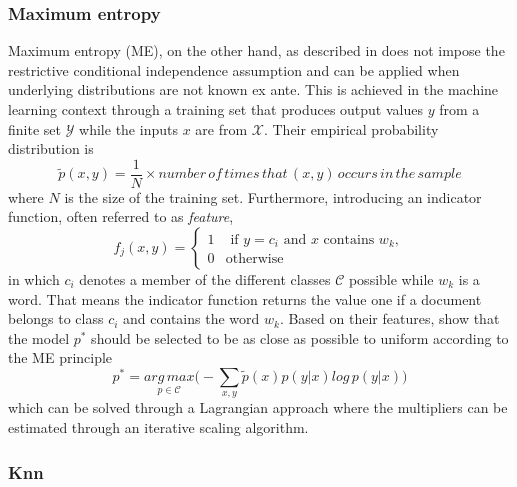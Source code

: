 \subsubsection{Maximum entropy} %
Maximum entropy (ME), on the other hand, as described in \textcite{Berger.1996} does not impose the restrictive conditional independence assumption and can be applied when underlying distributions are not known ex ante. 
This is achieved in the machine learning context through a training set that produces output values $y$ from a finite set $\mathcal{Y}$ while the inputs $x$ are from $\mathcal{X}$. Their empirical probability distribution is
%
\begin{equation*}
	\tilde{p}(x,y) = \frac{1}{N}\times number\, of\, times\, that\, (x,y)\, occurs\, in\, the\, sample
\end{equation*}
%
where $N$ is the size of the training set. Furthermore, introducing an indicator function, often referred to as \textit{feature},
%
\begin{equation*}
	f_j(x,y) = 
				\begin{cases}
					1 &\text{ if } y = c_i \text{ and $x$ contains $w_k$},\\
					0 & \text{otherwise }
				\end{cases}
\end{equation*}
%
in which $c_i$ denotes a member of the different classes $\mathcal{C}$ possible while $w_k$ is a word. That means the indicator function returns the value one if a document belongs to class $c_i$ and contains the word $w_k$. Based on their features, \textcite{Berger.1996} show that the model $p^*$ should be selected to be as close as possible to uniform according to the ME principle
%
\begin{equation}
	p^* = \underset{p\in \mathcal{C}}{arg\, max} \big(-\sum_{x,y}\tilde{p}(x)p(y|x)log\, p(y|x)\big)
\end{equation}
%
which can be solved through a Lagrangian approach where the multipliers can be estimated through an iterative scaling algorithm. 

%
\subsubsection{Knn} %

